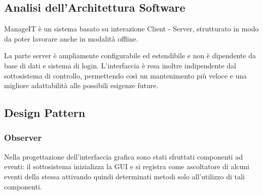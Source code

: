\documentclass[12pt]{scrartcl}
\begin{document}
\subsection{Analisi dell'Architettura Software}
ManageIT \`e un sistema basato su interazione Client - Server, strutturato
in modo da poter lavorare anche in modalit\`a offline.

La parte server \`e ampliamente configurabile ed estendibile e non \`e dipendente
da base di dati e sistema di login.
L'interfaccia \`e resa inoltre indipendente dal sottosistema di controllo,
permettendo cos\`i un mantenimento pi\`u veloce e una migliore adattabilit\`a
alle possibili esigenze future.

\subsection{Design Pattern}
\subsubsection{Observer}
Nella progettazione dell'interfaccia grafica sono stati sfruttati
componenti ad eventi: il sottosistema inizializza la GUI e si registra
come ascoltatore di alcuni eventi della stessa attivando quindi 
determinati metodi solo all'utilizzo di tali componenti.
\end{document}
